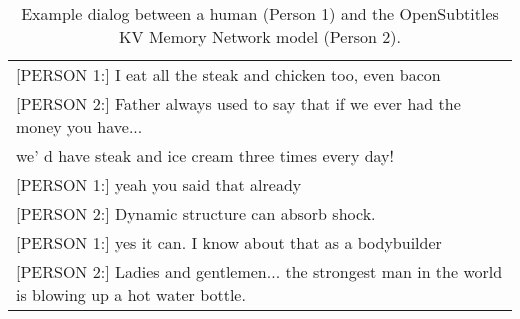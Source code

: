 \begin{table*}[t]
\begin{center}
\begin{small}
\begin{tabular}{l|l}
\multicolumn{2}{l}{[PERSON 1:] I eat all the steak and chicken too, even bacon}\\
\multicolumn{2}{l}{[PERSON 2:] Father always used to say that if we ever had the money you have...}\\ \multicolumn{2}{l}{we' d have steak and ice cream three times every day!}\\
\multicolumn{2}{l}{[PERSON 1:] yeah you said that already}\\
\multicolumn{2}{l}{[PERSON 2:] Dynamic structure can absorb shock.}\\
\multicolumn{2}{l}{[PERSON 1:] yes it can. I know about that as a bodybuilder}\\
\multicolumn{2}{l}{[PERSON 2:] Ladies and gentlemen... the strongest man in the world is blowing up a hot water bottle.}\\
      \end{tabular}
      \caption{Example dialog between a human (Person 1) and the OpenSubtitles KV Memory Network model (Person 2). %
 \label{table:os-example}}
    \end{small}
  \end{center}
\end{table*}




